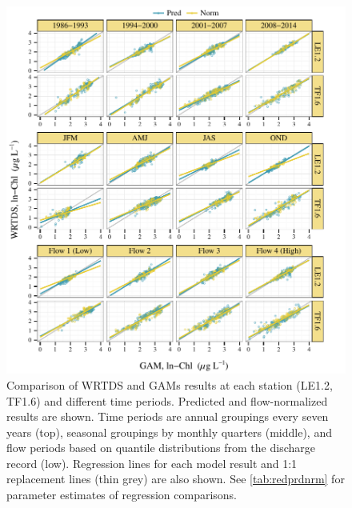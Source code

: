 \documentclass[letterpaper,12pt,oneside]{article}\usepackage[]{graphicx}\usepackage[]{color}
\makeatletter
\def\maxwidth{ %
  \ifdim\Gin@nat@width>\linewidth
    \linewidth
  \else
    \Gin@nat@width
  \fi
}
\makeatother
\begin{document}
\begin{figure}[!ht]

{\centering \includegraphics[width=\maxwidth]{figs/regprdnrm-1} 

}

\caption{Comparison of \ac{WRTDS} and \acp{GAM} results at each station (LE1.2, TF1.6) and different time periods.  Predicted and flow-normalized results are shown.  Time periods are annual groupings every seven years (top), seasonal groupings by monthly quarters (middle), and flow periods based on quantile distributions from the discharge record (low).  Regression lines for each model result and 1:1 replacement lines (thin grey) are also shown.  See \cref{tab:redprdnrm} for parameter estimates of regression comparisons.}\label{fig:regprdnrm}
\end{figure}





\end{document}
